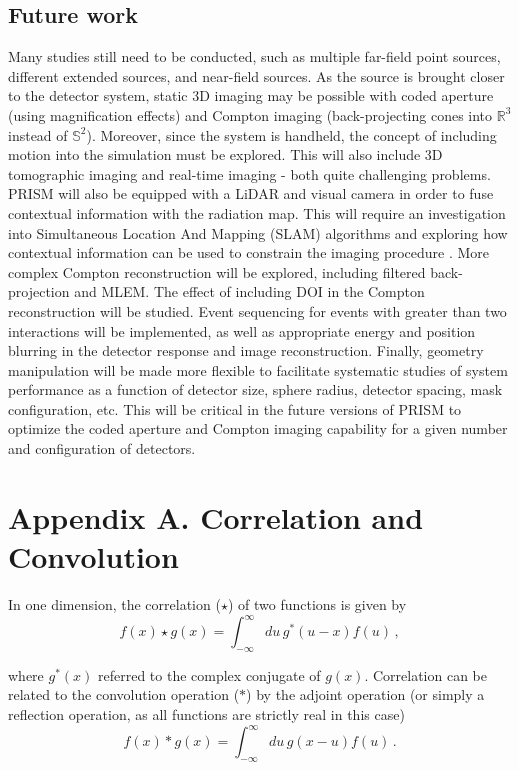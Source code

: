 \documentclass[10pt]{article}
\begin{document}
\subsection{Future work}

Many studies still need to be conducted, such as multiple far-field point sources, different extended sources, and near-field sources. As the source is brought closer to the detector system, static 3D imaging may be possible with coded aperture (using magnification effects) and Compton imaging (back-projecting cones into $\mathbb{R}^3$ instead of $\mathbb{S}^2$). Moreover, since the system is handheld, the concept of including motion into the simulation must be explored. This will also include 3D tomographic imaging and real-time imaging - both quite challenging problems. PRISM will also be equipped with a LiDAR and visual camera in order to fuse contextual information with the radiation map. This will require an investigation into Simultaneous Location And Mapping (SLAM) algorithms and exploring how contextual information can be used to constrain the imaging procedure \cite{Barnowski2015}. More complex Compton reconstruction will be explored, including filtered back-projection and MLEM. The effect of including DOI in the Compton reconstruction will be studied. Event sequencing for events with greater than two interactions will be implemented, as well as appropriate energy and position blurring in the detector response and image reconstruction. Finally, geometry manipulation will be made more flexible to facilitate systematic studies of system performance as a function of detector size, sphere radius, detector spacing, mask configuration, etc. This will be critical in the future versions of PRISM to optimize the coded aperture and Compton imaging capability for a given number and configuration of detectors. 




\section*{Appendix A. Correlation and Convolution}

In one dimension, the correlation ($\star$) of two functions is given by
%
\begin{equation} \tag{A.1}
	f(x) \star g(x) = \int_{-\infty}^\infty du\,g^\ast(u-x)f(u)\,,
\end{equation}

\noindent where $g^\ast(x)$ referred to the complex conjugate of $g(x)$. Correlation can be related to the convolution operation ($\ast$) by the adjoint operation (or simply a reflection operation, as all functions are strictly real in this case)
%
\begin{equation} \tag{A.2}
	f(x) \ast g(x) = \int_{-\infty}^\infty du\,g(x-u)f(u)\,.
\end{equation}
\end{document}
